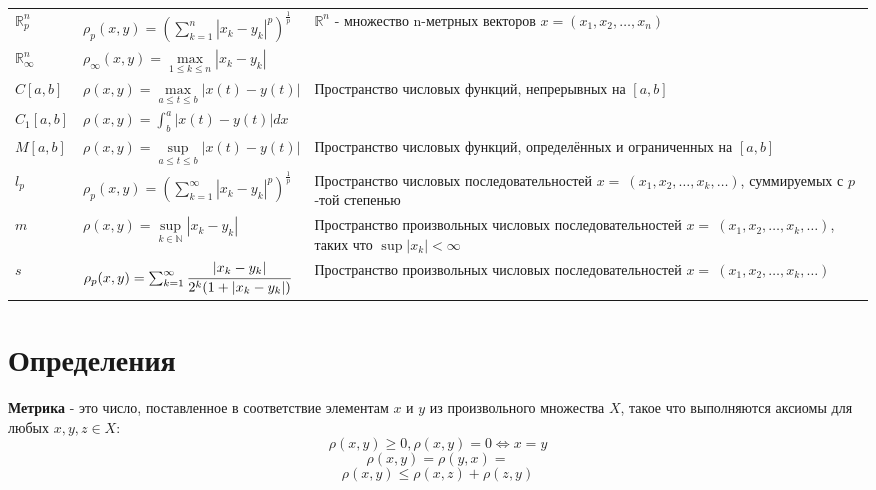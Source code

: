 {\begin{tabularx}{\textwidth}{||l|l|X||}
      $\mathbb{R}^n_p$      & $\rho_p (x, y)=(\sum_{k = 1}^{n}|x_k-y_k|^p)^\frac{1}{p}$            & \multirow{2}{6cm}{$\mathbb{R}^n$ - множество n-метрных векторов $x=(x_1, x_2, \dots, x_n)$  }                         \\
      \cline{1-2}
      $\mathbb{R}^n_\infty$ & $\rho_\infty (x, y)=\underset{1\leq k\leq n}{\max}|x_k-y_k|$              &                                                                                                                    \\
      \hline
      $C[a, b]$              & $\rho (x, y)=\underset{a \leq t \leq b}{\max}|x(t)-y(t)|$                 & \multirow{2}{6cm}{Пространство числовых функций, непрерывных на $[a, b]$}                                           \\
      \cline{1-2}
      $C_1[a, b]$            & $\rho (x, y)=\int_{b}^{a}|x(t)-y(t)|dx $                                &                                                                                                                    \\[5pt]
      \hline
      $M[a, b]$              & $\rho (x, y)=\underset{a \leq t \leq b}{\sup}|x(t)-y(t)|$                 & Пространство числовых функций, определённых и ограниченных на $[a, b]$                                              \\
      \hline
      $l_p$                 & $\rho_p (x, y)=(\sum_{k = 1}^{\infty}|x_k-y_k|^p)^\frac{1}{p}$            & Пространство числовых последовательностей $x=~(x_1, x_2, \dots, x_k, \dots)$, суммируемых с $p$-той степенью            \\
      \hline
      $m$                   & $\rho (x, y)=\underset{k \in \mathbb{N} }{\sup}|x_k-y_k|$                 & Пространство произвольных числовых последовательностей $x=~(x_1, x_2, \dots, x_k, \dots)$, таких что $\sup|x_k|<\infty$ \\
      \hline
      $s$                   & $\rho_p (x, y)=\sum_{k = 1}^{\infty} \cfrac{|x_k-y_k|}{2^k(1+|x_k-y_k|)}$ & Пространство произвольных числовых последовательностей $x=~(x_1, x_2, \dots, x_k, \dots)$                               \\
      \hline
  \end{tabularx}}


\section{Определения}

\textbf{Метрика} - это число, поставленное в соответствие элементам $x$ и $y$ из произвольного множества $X$, такое что выполняются аксиомы для любых $x, y, z\in X$:
\[\rho(x, y)\geq 0, \rho(x, y)=0\Longleftrightarrow x=y\]
\[\rho(x, y)=\rho(y, x)=\]
\[\rho(x, y)\leqslant \rho(x, z)+\rho(z, y)\]

